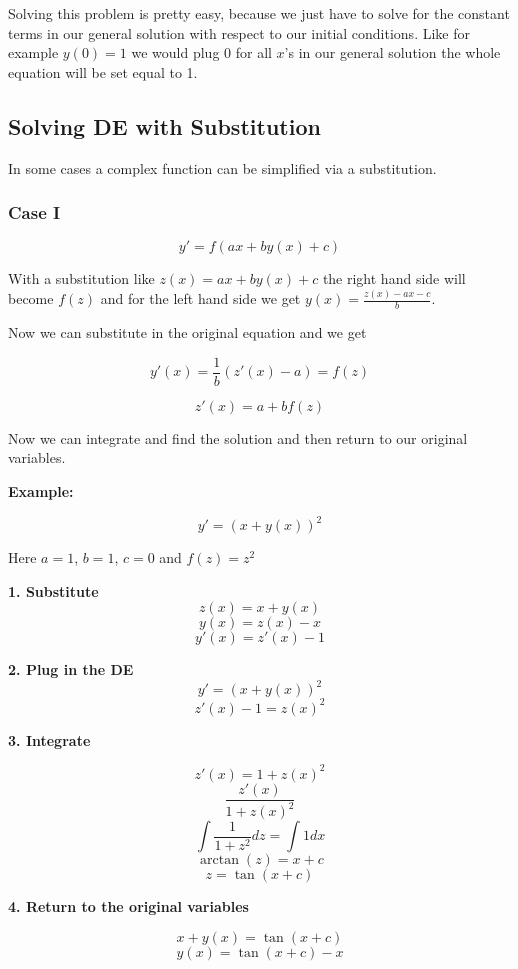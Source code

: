 Solving this problem is pretty easy, because we just have to solve for the constant terms
in our general solution with respect to our initial conditions. Like for example \(y(0) = 1\)
we would plug 0 for all \(x\)'s in our general solution the whole equation will be set equal to 1.

\subsection{Solving DE with Substitution}

In some cases a complex function can be simplified via a substitution.

\subsubsection{Case I}

\[y' = f(ax + by(x) + c)\]

With a substitution like \(z(x) = ax + by(x) + c\) the right hand side will become \(f(z)\)
and for the left hand side we get \(y(x) = \frac{z(x) - ax - c}{b}\).
\vspace{\baselineskip}

Now we can substitute in the original equation and we get

\[y'(x) = \frac{1}{b} (z'(x) - a) = f(z)\]

\[z'(x) = a + b f(z)\]

Now we can integrate and find the solution and then return to our original variables.
\vspace{\baselineskip}

\textbf{Example:}

\[y' = (x + y(x))^2\]

Here \(a = 1\), \(b = 1\), \(c = 0\) and \(f(z) = z^2\)
\vspace{\baselineskip}

\textbf{1. Substitute}
\[
z(x) = x + y(x)
\]
\[y(x) = z(x) - x\]
\[y'(x) = z'(x) - 1\]

\textbf{2. Plug in the DE}
\[y' = {(x + y(x))}^2\]
\[z'(x) - 1 = {z(x)}^2\]

\textbf{3. Integrate}

\[z'(x) = 1 + {z(x)}^2\]
\[\frac{z'(x)}{1 + {z(x)}^2}\]
\[\int \frac{1}{1 + z^2} dz = \int 1 dx\]
\[\arctan (z) = x + c\]
\[z = \tan(x + c)\]

\textbf{4. Return to the original variables}

\[x + y(x) = \tan(x + c)\]
\[y(x) = \tan(x + c) - x\]


